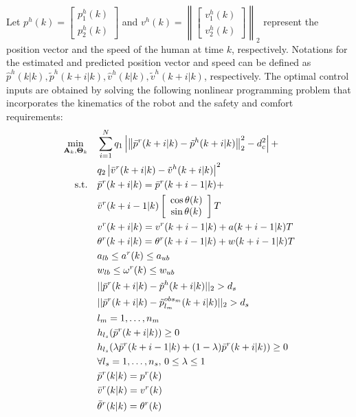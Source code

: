 \documentclass[letterpaper, 10 pt, conference]{ieeeconf}
\begin{document}
	Let $p^h(k)=
	\left[ 
	\begin{array}{c}
	p^h_1(k)\\
	p^h_2(k)
	\end{array}\right] $ and $v^h(k)=
	\left\|\left[ 
	\begin{array}{c}
	v^h_1(k)\\
	v^h_2(k)
	\end{array}\right]\right\|_2
	$ represent the position vector and the speed of the human at time $k$, respectively.
	Notations for the estimated and predicted position vector and speed can be defined as $\hat{p}^h(k|k),\tilde{p}^h(k+i|k),\hat{v}^h(k|k),\tilde{v}^h(k+i|k)$, respectively.
	The optimal control inputs are obtained by solving the following nonlinear programming problem that incorporates the kinematics of the robot and the safety and comfort requirements:
	\begin{subequations}\label{eqn:path_plan_mpc}
		\begin{align}
			\min_{\mathbf{A}_k,\mathbf{\Theta}_k} \quad &\sum\limits_{i=1}^{N} q_1\left| \left\|\bar{p}^r(k+i|k)-\tilde{p}^h(k+i|k)\right\|^2_2-d^2_{c}\right| + \notag\\
			& q_2\left|\bar{v}^r(k+i|k)-\tilde{v}^h(k+i|k)\right|^2\label{eqn:obj}\\
			\text{s.t.} \quad & \bar{p}^r(k+i|k)=\bar{p}^r(k+i-1|k)+\notag\\
			&\bar{v}^r(k+i-1|k)
			\left[ 
			\begin{array}{c}
				\cos \theta(k)\\
				\sin \theta(k)\\
			\end{array}
			\right]T\label{eqn:constr:dyn_pre_motion}\\
			& v^r(k+i|k)=v^r(k+i-1|k)+a(k+i-1|k)T\label{eqn:constr:dyn_pre_v}\\       &\theta^r(k+i|k)=\theta^r(k+i-1|k)+w(k+i-1|k)T\label{eqn:constr:dyn_pre_theta}\\
			& a_{lb}\le a^r(k)\le a_{ub}\label{eqn:constr:a}\\
			& w_{lb}\le \omega^r(k)\le w_{ub}\label{eqn:constr:w}\\
			& ||\bar{p}^r(k+i|k)-\tilde{p}^h(k+i|k)||_2> d_s\label{eqn:constr:safety_human}\\
			& ||\bar{p}^r(k+i|k)-\tilde{p}^{obs_m}_{l_m}(k+i|k)||_2> d_s\label{eqn:constr:safety_mv_obs}\\
			& l_m=1,\dots,n_m\notag\\
			& h_{l_s}(\bar{p}^r(k+i|k))\ge 0\label{eqn:constr:safety_s_obs1}\\
			& h_{l_s}(\lambda \bar{p}^r(k+i-1|k)+(1-\lambda)\bar{p}^r(k+i|k))\ge 0\label{eqn:constr:safety_s_obs2}\\
			& \forall l_s=1,\dots,n_s,\, 0\le \lambda\le 1\notag\\
			& \bar{p}^r(k|k)=p^r(k)\label{eqn:constr:init_z}\\
			& \bar{v}^r(k|k)=v^r(k)\label{eqn:constr:init_v}\\
			& \bar{\theta}^r(k|k)=\theta^r(k)\label{eqn:constr:init_theta}
		\end{align}
	\end{subequations}
\end{document}
